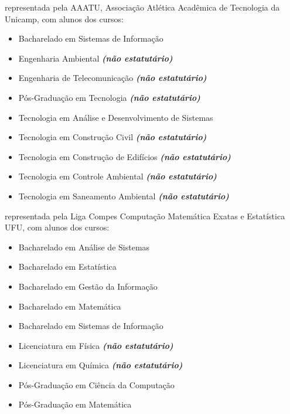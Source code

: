 \begin{article}
\begin{description}[noitemsep]
		\item[UNICAMP - Limeira] representada pela AAATU, Associação Atlética Acadêmica de Tecnologia da Unicamp, com alunos dos cursos:
		\begin{itemize}[noitemsep]
			\item Bacharelado em Sistemas de Informação
			\item Engenharia Ambiental \textbf{\textit{(não estatutário)}}
			\item Engenharia de Telecomunicação \textbf{\textit{(não estatutário)}}
			\item Pós-Graduação em Tecnologia \textbf{\textit{(não estatutário)}}
			\item Tecnologia em Análise e Desenvolvimento de Sistemas
			\item Tecnologia em Construção Civil \textbf{\textit{(não estatutário)}}
			\item Tecnologia em Construção de Edifícios \textbf{\textit{(não estatutário)}}
			\item Tecnologia em Controle Ambiental \textbf{\textit{(não estatutário)}}
			\item Tecnologia em Saneamento Ambiental \textbf{\textit{(não estatutário)}}
		\end{itemize}

		\item[UFU] representada pela Liga Compes Computação Matemática Exatas e Estatística UFU, com alunos dos cursos:
		\begin{itemize}[noitemsep]
			\item Bacharelado em Análise de Sistemas
			\item Bacharelado em Estatística
			\item Bacharelado em Gestão da Informação
			\item Bacharelado em Matemática
			\item Bacharelado em Sistemas de Informação
			\item Licenciatura em Física \textbf{\textit{(não estatutário)}}
			\item Licenciatura em Química \textbf{\textit{(não estatutário)}}
			\item Pós-Graduação em Ciência da Computação
			\item Pós-Graduação em Matemática
		\end{itemize}
	\end{description}
\end{article}
